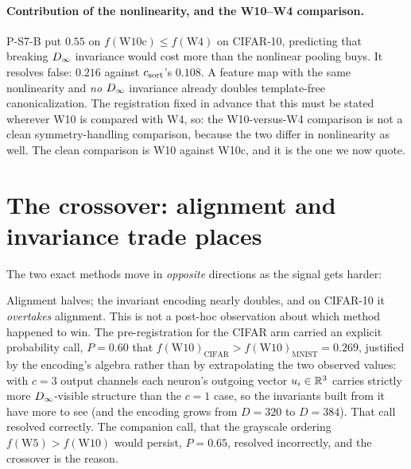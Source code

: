 \paragraph{Contribution of the nonlinearity, and the W10--W4 comparison.}
P-S7-B put $0.55$ on $f(\mathrm{W10c}) \le f(\mathrm{W4})$ on CIFAR-10, predicting that breaking $D_\infty$ invariance would cost more than the nonlinear pooling buys. It resolves false: $0.216$ against
$c_{\mathrm{sort}}$'s $0.108$. A feature map with the same nonlinearity and \emph{no} $D_\infty$ invariance
already doubles template-free canonicalization. The registration fixed in advance that this must be
stated wherever W10 is compared with W4, so: the W10-versus-W4 comparison is not a clean
symmetry-handling comparison, because the two differ in nonlinearity as well. The clean comparison
is W10 against W10c, and it is the one we now quote.


\section{The crossover: alignment and invariance trade places}\label{app:crossover}\label{sec:crossover}

The two exact methods move in \emph{opposite} directions as the signal gets harder:
\begin{center}\small
{}
\end{center}

Alignment halves; the invariant encoding nearly doubles, and on CIFAR-10 it \emph{overtakes}
alignment. This is not a post-hoc observation about which method happened to win. The
pre-registration for the CIFAR arm carried an explicit probability call, $P = 0.60$ that
$f(\mathrm{W10})_{\text{CIFAR}} > f(\mathrm{W10})_{\text{MNIST}} = 0.269$, justified by the
encoding's algebra rather than by extrapolating the two observed values: with $c = 3$ output
channels each neuron's outgoing vector $u_i \in \mathbb{R}^3$ carries strictly more $D_\infty$-visible
structure than the $c = 1$ case, so the invariants built from it have more to see (and the
encoding grows from $D = 320$ to $D = 384$). That call resolved correctly. The companion call, that the grayscale ordering $f(\mathrm{W5}) > f(\mathrm{W10})$ would persist, $P = 0.65$, resolved incorrectly, and the crossover is the reason.

